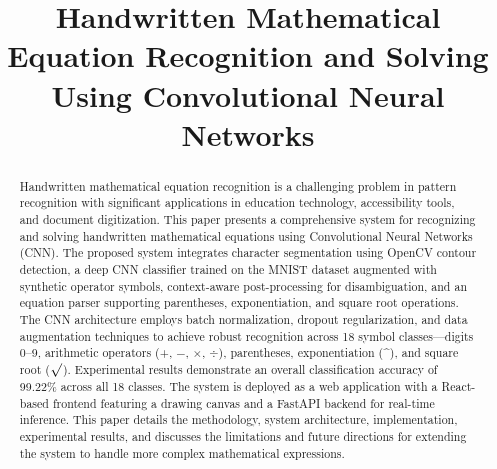 \documentclass[conference]{IEEEtran}
\begin{document}
\title{Handwritten Mathematical Equation Recognition and Solving Using Convolutional Neural Networks}

\author{
}

\maketitle

\begin{abstract}
Handwritten mathematical equation recognition is a challenging problem in pattern recognition with significant applications in education technology, accessibility tools, and document digitization. This paper presents a comprehensive system for recognizing and solving handwritten mathematical equations using Convolutional Neural Networks (CNN). The proposed system integrates character segmentation using OpenCV contour detection, a deep CNN classifier trained on the MNIST dataset augmented with synthetic operator symbols, context-aware post-processing for disambiguation, and an equation parser supporting parentheses, exponentiation, and square root operations. The CNN architecture employs batch normalization, dropout regularization, and data augmentation techniques to achieve robust recognition across 18 symbol classes---digits 0--9, arithmetic operators (+, $-$, $\times$, $\div$), parentheses, exponentiation (\^{}), and square root ($\surd$). Experimental results demonstrate an overall classification accuracy of 99.22\% across all 18 classes. The system is deployed as a web application with a React-based frontend featuring a drawing canvas and a FastAPI backend for real-time inference. This paper details the methodology, system architecture, implementation, experimental results, and discusses the limitations and future directions for extending the system to handle more complex mathematical expressions.
\end{abstract}
\end{document}
